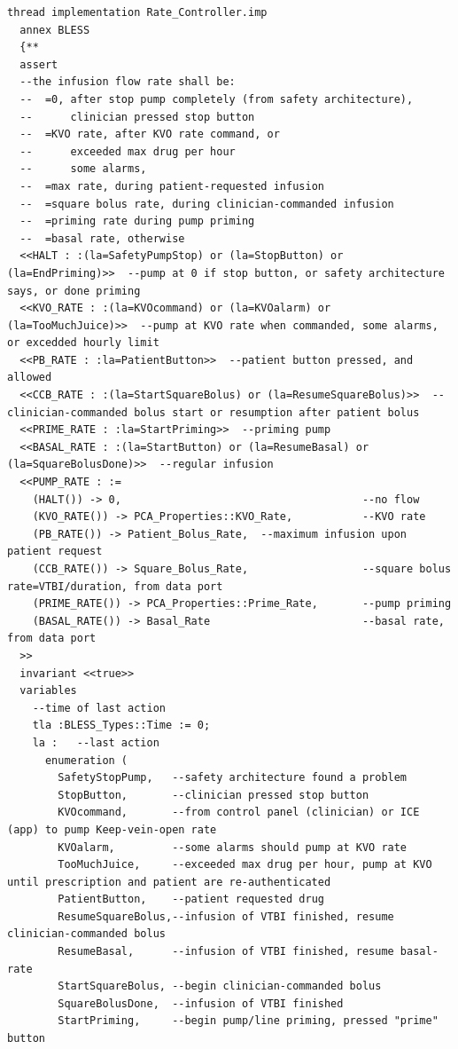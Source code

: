 \begin{lstlisting}[language=aadl, frame=single, gobble=0, caption={\lstinline{Rate_Controller} thread from \lstinline{PCA_Operation} component with BLESS assertions}, label={listing:rate_controller}]
  thread implementation Rate_Controller.imp
  annex BLESS
  {**
  assert
  --the infusion flow rate shall be:
  --  =0, after stop pump completely (from safety architecture), 
  --      clinician pressed stop button
  --  =KVO rate, after KVO rate command, or
  --      exceeded max drug per hour
  --      some alarms,
  --  =max rate, during patient-requested infusion
  --  =square bolus rate, during clinician-commanded infusion 
  --  =priming rate during pump priming
  --  =basal rate, otherwise
  <<HALT : :(la=SafetyPumpStop) or (la=StopButton) or (la=EndPriming)>>  --pump at 0 if stop button, or safety architecture says, or done priming
  <<KVO_RATE : :(la=KVOcommand) or (la=KVOalarm) or (la=TooMuchJuice)>>  --pump at KVO rate when commanded, some alarms, or excedded hourly limit
  <<PB_RATE : :la=PatientButton>>  --patient button pressed, and allowed
  <<CCB_RATE : :(la=StartSquareBolus) or (la=ResumeSquareBolus)>>  --clinician-commanded bolus start or resumption after patient bolus
  <<PRIME_RATE : :la=StartPriming>>  --priming pump
  <<BASAL_RATE : :(la=StartButton) or (la=ResumeBasal) or (la=SquareBolusDone)>>  --regular infusion
  <<PUMP_RATE : :=
    (HALT()) -> 0,                                      --no flow
    (KVO_RATE()) -> PCA_Properties::KVO_Rate,           --KVO rate
    (PB_RATE()) -> Patient_Bolus_Rate,  --maximum infusion upon patient request
    (CCB_RATE()) -> Square_Bolus_Rate,                  --square bolus rate=VTBI/duration, from data port
    (PRIME_RATE()) -> PCA_Properties::Prime_Rate,       --pump priming
    (BASAL_RATE()) -> Basal_Rate                        --basal rate, from data port
  >>
  invariant <<true>>
  variables
    --time of last action
    tla :BLESS_Types::Time := 0;
    la :   --last action
      enumeration ( 
        SafetyStopPump,   --safety architecture found a problem
        StopButton,       --clinician pressed stop button
        KVOcommand,       --from control panel (clinician) or ICE (app) to pump Keep-vein-open rate
        KVOalarm,         --some alarms should pump at KVO rate
        TooMuchJuice,     --exceeded max drug per hour, pump at KVO until prescription and patient are re-authenticated
        PatientButton,    --patient requested drug
        ResumeSquareBolus,--infusion of VTBI finished, resume clinician-commanded bolus
        ResumeBasal,      --infusion of VTBI finished, resume basal-rate
        StartSquareBolus, --begin clinician-commanded bolus
        SquareBolusDone,  --infusion of VTBI finished
        StartPriming,     --begin pump/line priming, pressed "prime" button

\end{lstlisting}
